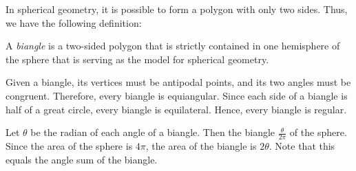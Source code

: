 \documentclass[12pt]{article}
\begin{document}
In spherical geometry, it is possible to form a polygon with only two sides.  Thus, we have the following definition:

A \emph{biangle} is a two-sided polygon that is strictly contained in one hemisphere of the sphere that is serving as the model for spherical geometry.

Given a biangle, its vertices must be antipodal points, and its two angles must be congruent.  Therefore, every biangle is equiangular.  Since each side of a biangle is half of a great circle, every biangle is equilateral.  Hence, every biangle is regular.

Let $\theta$ be the radian  of each angle of a biangle.  Then the biangle  $\displaystyle \frac{\theta}{2\pi}$ of the sphere.  Since the area of the sphere is $4\pi$, the area of the biangle is $2\theta$.  Note that this equals the angle sum of the biangle.
\end{document}
